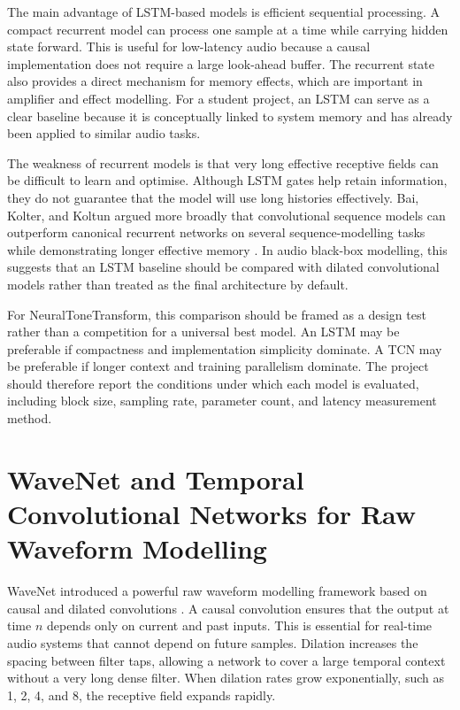 \documentclass[conference]{IEEEtran}
\begin{document}
The main advantage of LSTM-based models is efficient sequential processing. A compact recurrent model can process one sample at a time while carrying hidden state forward. This is useful for low-latency audio because a causal implementation does not require a large look-ahead buffer. The recurrent state also provides a direct mechanism for memory effects, which are important in amplifier and effect modelling. For a student project, an LSTM can serve as a clear baseline because it is conceptually linked to system memory and has already been applied to similar audio tasks.

The weakness of recurrent models is that very long effective receptive fields can be difficult to learn and optimise. Although LSTM gates help retain information, they do not guarantee that the model will use long histories effectively. Bai, Kolter, and Koltun argued more broadly that convolutional sequence models can outperform canonical recurrent networks on several sequence-modelling tasks while demonstrating longer effective memory \cite{bai2018tcn}. In audio black-box modelling, this suggests that an LSTM baseline should be compared with dilated convolutional models rather than treated as the final architecture by default.

For NeuralToneTransform, this comparison should be framed as a design test rather than a competition for a universal best model. An LSTM may be preferable if compactness and implementation simplicity dominate. A TCN may be preferable if longer context and training parallelism dominate. The project should therefore report the conditions under which each model is evaluated, including block size, sampling rate, parameter count, and latency measurement method.

\section{WaveNet and Temporal Convolutional Networks for Raw Waveform Modelling}

WaveNet introduced a powerful raw waveform modelling framework based on causal and dilated convolutions \cite{oord2016wavenet}. A causal convolution ensures that the output at time $n$ depends only on current and past inputs. This is essential for real-time audio systems that cannot depend on future samples. Dilation increases the spacing between filter taps, allowing a network to cover a large temporal context without a very long dense filter. When dilation rates grow exponentially, such as 1, 2, 4, and 8, the receptive field expands rapidly.
\end{document}
